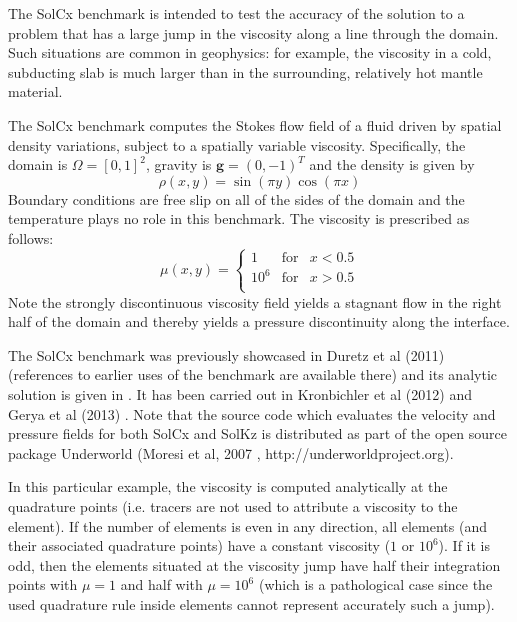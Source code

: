 

The SolCx benchmark is intended to test the accuracy of the solution to a problem that has a large jump in the viscosity along a line through the domain. Such situations are common in geophysics: for example, the viscosity in a cold, subducting slab is much larger than in the surrounding, relatively hot mantle material.

The SolCx benchmark computes the Stokes flow field of a fluid driven by spatial density variations, subject to a spatially variable viscosity. Specifically, the domain is $\Omega = [0,1]^2$, gravity is ${\bm g} = (0,-1)^T$ and the density is given by 
\begin{equation}
\rho(x,y) = \sin(\pi y) \cos(\pi x)
\end{equation}
Boundary conditions are free slip on all of the sides of the domain and the temperature plays no role in this benchmark. 
The viscosity is prescribed as follows:
\begin{equation}
\mu(x,y) = 
\left\{
\begin{array}{lll}
1 & \text{for} & x<0.5 \\
10^6 & \text{for} & x>0.5 \\
\end{array}
\right.
\end{equation}
Note the strongly discontinuous viscosity field yields a stagnant flow 
in the right half of the domain and thereby yields a pressure discontinuity along the interface. 

The SolCx benchmark was previously showcased in Duretz et al (2011) \cite{dumg11} (references to earlier 
uses of the benchmark are available there) and its analytic solution is given in \cite{zhon96}. 
It has been carried out in Kronbichler et al (2012) \cite{krhb12} and Gerya et al (2013) \cite{gemd13}. 
Note that the source code which evaluates the velocity and pressure fields for both SolCx and SolKz is 
distributed as part of the open source package Underworld (Moresi et al, 2007 \cite{moql07}, http://underworldproject.org).

In this particular example, the viscosity is computed analytically at the quadrature points (i.e. tracers are 
not used to attribute a viscosity to the element). 
If the number of elements is even in any direction, all elements (and their associated quadrature points)
have a constant viscosity ($1$ or  $10^6$). If it is odd, then the elements situated 
at the viscosity jump have half their integration points with $\mu=1$ and half with $\mu=10^6$ 
(which is a pathological case since the used quadrature rule inside elements cannot represent 
accurately such a jump).  

